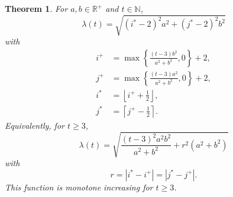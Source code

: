 \documentclass[12pt, a4paper]{article}
\newcommand{\funl}{\lambda} %
\newcommand{\tiles}{t} %
\newcommand{\isolr}{i^+}
\newcommand{\jsolr}{j^+}
\newcommand{\isoli}{i^\ast}
\newcommand{\jsoli}{j^\ast}
\newcommand{\roundterm}{r}
\newtheorem{theorem}{Theorem}%
\begin{document}
\begin{theorem}
\label{theo: funl, form}
For $a, b \in \mathbb R^+$ and $\tiles \in \mathbb N$,
\begin{equation}
\label{eq: theo: funl, form; funl}
\funl(\tiles) = \sqrt{(\isoli-2)^2 a^2 + (\jsoli-2)^2 b^2}
\end{equation}
with
\begin{align}
\label{eq: theo: funl, form; isolr}
\isolr &= \max\left\{ \frac{(\tiles-3) b^2}{a^2+b^2}, 0 \right\} + 2, \\
\label{eq: theo: funl, form; jsolr}
\jsolr &= \max\left\{ \frac{(\tiles-3) a^2}{a^2+b^2}, 0 \right\} + 2, \\
\label{eq: theo: funl, form; isoli}
\isoli &= \left\lfloor \isolr + \frac 1 2 \right\rfloor, \\
\label{eq: theo: funl, form; jsoli}
\jsoli &= \left\lceil \jsolr - \frac 1 2 \right\rceil.
\end{align}
Equivalently, for $\tiles \geq 3$,
\begin{equation}
\label{eq: theo: funl, form; funl 2}
\funl(\tiles) = \sqrt{\frac{(t-3)^2 a^2 b^2}{a^2+b^2} + \roundterm^2(a^2+b^2)}
\end{equation}
with
\begin{equation}
\label{eq: roundterm}
\roundterm = |\isoli - \isolr| = |\jsoli - \jsolr|.
\end{equation}
This function is monotone increasing for $\tiles \geq 3$.
\end{theorem}
\end{document}
